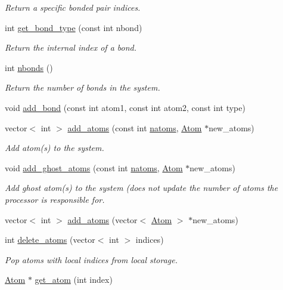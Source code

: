 \begin{DoxyCompactItemize}
\begin{DoxyCompactList}\small\item\em Return a specific bonded pair indices. \end{DoxyCompactList}\item 
\hypertarget{classSystem_adf6355446991e6541b119177623bc50d}{int \hyperlink{classSystem_adf6355446991e6541b119177623bc50d}{get\-\_\-bond\-\_\-type} (const int nbond)}\label{classSystem_adf6355446991e6541b119177623bc50d}

\begin{DoxyCompactList}\small\item\em Return the internal index of a bond. \end{DoxyCompactList}\item 
\hypertarget{classSystem_aeafaa4df6112a14cfb6d7204122543b0}{int \hyperlink{classSystem_aeafaa4df6112a14cfb6d7204122543b0}{nbonds} ()}\label{classSystem_aeafaa4df6112a14cfb6d7204122543b0}

\begin{DoxyCompactList}\small\item\em Return the number of bonds in the system. \end{DoxyCompactList}\item 
void \hyperlink{classSystem_a9247ae66b5bcb1614098184534173c7e}{add\-\_\-bond} (const int atom1, const int atom2, const int type)
\item 
vector$<$ int $>$ \hyperlink{classSystem_a18414259029791b3ee347eec3726f70a}{add\-\_\-atoms} (const int \hyperlink{classSystem_a92088c8b2f7416199537a7e7f3152aff}{natoms}, \hyperlink{structAtom}{Atom} $\ast$new\-\_\-atoms)
\begin{DoxyCompactList}\small\item\em Add atom(s) to the system. \end{DoxyCompactList}\item 
void \hyperlink{classSystem_a57b78a811d645a98999e32c9d1a3e520}{add\-\_\-ghost\-\_\-atoms} (const int \hyperlink{classSystem_a92088c8b2f7416199537a7e7f3152aff}{natoms}, \hyperlink{structAtom}{Atom} $\ast$new\-\_\-atoms)
\begin{DoxyCompactList}\small\item\em Add ghost atom(s) to the system (does not update the number of atoms the processor is responsible for. \end{DoxyCompactList}\item 
vector$<$ int $>$ \hyperlink{classSystem_a25243a7d9f3d58f6ce7c9d2699c0924e}{add\-\_\-atoms} (vector$<$ \hyperlink{structAtom}{Atom} $>$ $\ast$new\-\_\-atoms)
\item 
int \hyperlink{classSystem_a32e588844500d6ae56f5a7ac9a65014f}{delete\-\_\-atoms} (vector$<$ int $>$ indices)
\begin{DoxyCompactList}\small\item\em Pop atoms with local indices from local storage. \end{DoxyCompactList}\item 
\hypertarget{classSystem_acc3e9636aa22693652559b987b71b279}{\hyperlink{structAtom}{Atom} $\ast$ \hyperlink{classSystem_acc3e9636aa22693652559b987b71b279}{get\-\_\-atom} (int index)}\label{classSystem_acc3e9636aa22693652559b987b71b279}


\end{DoxyCompactItemize}
